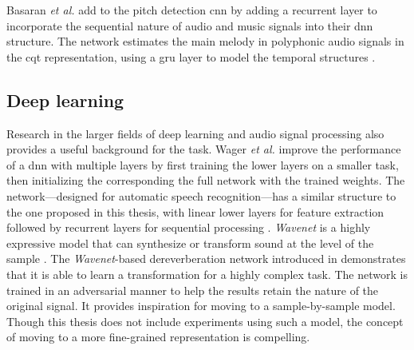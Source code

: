 Basaran {\it et al.} add to the pitch detection \gls{cnn} by adding a recurrent layer to incorporate the sequential nature of audio and music signals into their \gls{dnn} structure. The network estimates the main melody in polyphonic audio signals in the \gls{cqt} representation, using a \gls{gru} layer \cite{chung2014empirical, ChoK2014arxiv} to model the temporal structures \cite{basaranmain}. 

\subsection{Deep learning}
Research in the larger fields of deep learning and audio signal processing also provides a useful background for the task. Wager \textit{et al.} improve the performance of a \gls{dnn} with multiple layers by first training the lower layers on a smaller task, then initializing the corresponding the full network with the trained weights. The network---designed for automatic speech recognition---has a similar structure to the one proposed in this thesis, with linear lower layers for feature extraction followed by recurrent layers for sequential processing \cite{wager2020fully}.
\textit{Wavenet} is a highly expressive model that can synthesize or transform sound at the level of the sample \cite{oord2016wavenet}. The \textit{Wavenet}-based dereverberation network introduced in \cite{su2020hifi} demonstrates that it is able to learn a transformation for a highly complex task. The network is trained in an adversarial manner \cite{goodfellow2014generative} to help the results retain the nature of the original signal. It provides inspiration for moving to a sample-by-sample model. Though this thesis does not include experiments using such a model, the concept of moving to a more fine-grained representation is compelling.

